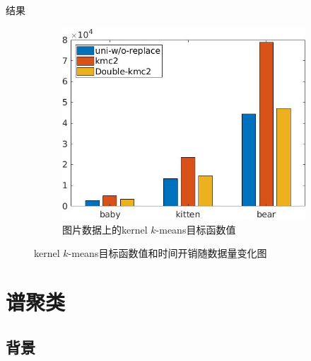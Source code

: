 \documentclass[notheorems]{beamer}
\begin{document}
\begin{CJK*}{UTF8}{gbsn}
\begin{frame}{结果}
{\begin{minipage}{1.0\linewidth}
\begin{figure}[H]
\begin{subfigure}{0.493\columnwidth}
					\includegraphics[width=\linewidth]{image-obj.jpg}
					\caption{图片数据上的kernel $k$-means目标函数值}
				\end{subfigure}
				
				
				\caption{kernel $k$-means目标函数值和时间开销随数据量变化图}
				\label{fig: image running time & ncut}
			\end{figure}
		\end{minipage}
	}
	
\end{frame}

\section{谱聚类}

\subsection{背景}


\end{CJK*}
\end{document}
